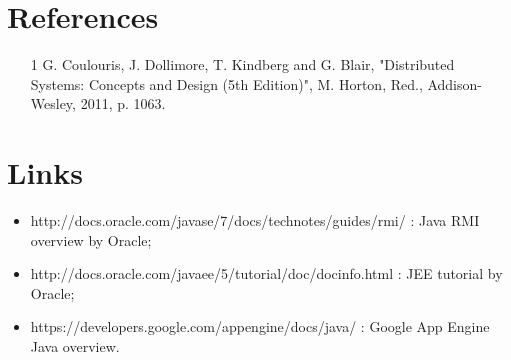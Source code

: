 \section*{References}

\begin{itemize}
	\item [1] G. Coulouris, J. Dollimore, T. Kindberg and G. Blair, "Distributed Systems: Concepts and Design (5th Edition)", M. Horton, Red., Addison-Wesley, 2011, p. 1063.
\end{itemize}



\section*{Links}

\begin{itemize}
	\item http://docs.oracle.com/javase/7/docs/technotes/guides/rmi/ : Java RMI overview by Oracle;
	\item http://docs.oracle.com/javaee/5/tutorial/doc/docinfo.html : JEE tutorial by Oracle;
	\item https://developers.google.com/appengine/docs/java/ : Google App Engine Java overview.
\end{itemize}
